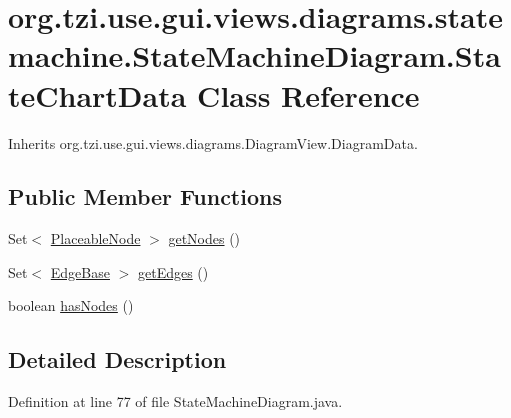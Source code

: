 \hypertarget{classorg_1_1tzi_1_1use_1_1gui_1_1views_1_1diagrams_1_1statemachine_1_1_state_machine_diagram_1_1_state_chart_data}{\section{org.\-tzi.\-use.\-gui.\-views.\-diagrams.\-statemachine.\-State\-Machine\-Diagram.\-State\-Chart\-Data Class Reference}
\label{classorg_1_1tzi_1_1use_1_1gui_1_1views_1_1diagrams_1_1statemachine_1_1_state_machine_diagram_1_1_state_chart_data}
}


Inherits org.\-tzi.\-use.\-gui.\-views.\-diagrams.\-Diagram\-View.\-Diagram\-Data.

\subsection*{Public Member Functions}
\begin{DoxyCompactItemize}
\item 
Set$<$ \hyperlink{classorg_1_1tzi_1_1use_1_1gui_1_1views_1_1diagrams_1_1elements_1_1_placeable_node}{Placeable\-Node} $>$ \hyperlink{classorg_1_1tzi_1_1use_1_1gui_1_1views_1_1diagrams_1_1statemachine_1_1_state_machine_diagram_1_1_state_chart_data_ac1ca9aa6d322350531bc6f8d1ce6ea20}{get\-Nodes} ()
\item 
Set$<$ \hyperlink{classorg_1_1tzi_1_1use_1_1gui_1_1views_1_1diagrams_1_1elements_1_1edges_1_1_edge_base}{Edge\-Base} $>$ \hyperlink{classorg_1_1tzi_1_1use_1_1gui_1_1views_1_1diagrams_1_1statemachine_1_1_state_machine_diagram_1_1_state_chart_data_af4aa92a52f455d63c97c6fdc408bc3f3}{get\-Edges} ()
\item 
boolean \hyperlink{classorg_1_1tzi_1_1use_1_1gui_1_1views_1_1diagrams_1_1statemachine_1_1_state_machine_diagram_1_1_state_chart_data_a64d5bbb272af353615934e5cb8e46e5c}{has\-Nodes} ()
\end{DoxyCompactItemize}


\subsection{Detailed Description}


Definition at line 77 of file State\-Machine\-Diagram.\-java.



